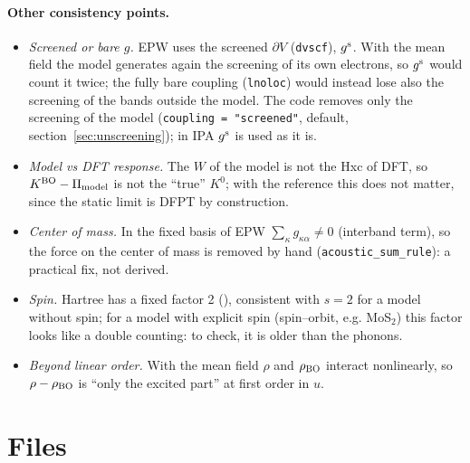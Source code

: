 \documentclass[11pt]{article}
\begin{document}
\paragraph{Other consistency points.}
\begin{itemize}
\item \emph{Screened or bare $g$.} EPW uses the screened $\partial V$ (\texttt{dvscf}), $g^{\rm s}$. With the mean field the
  model generates again the screening of its own electrons, so $g^{\rm s}$ would count it twice; the fully bare coupling
  (\texttt{lnoloc}) would instead lose also the screening of the bands outside the model. The code removes only the
  screening of the model (\texttt{coupling = "screened"}, default, section~\ref{sec:unscreening}); in IPA $g^{\rm s}$ is used as it is.
\item \emph{Model vs DFT response.} The $W$ of the model is not the Hxc of DFT, so $K^{\rm BO}-\Pi_{\rm model}$ is not the
  ``true'' $K^0$; with the reference this does not matter, since the static limit is DFPT by construction.
\item \emph{Center of mass.} In the fixed basis of EPW $\sum_\kappa g_{\kappa\alpha}\neq0$ (interband term), so the force on
  the center of mass is removed by hand (\texttt{acoustic\_sum\_rule}): a practical fix, not derived.
\item \emph{Spin.} Hartree has a fixed factor 2 (), consistent with $s=2$ for a model without spin;
  for a model with explicit spin (spin--orbit, e.g. MoS$_2$) this factor looks like a double counting: to check, it is
  older than the phonons.
\item \emph{Beyond linear order.} With the mean field $\rho$ and $\rho_{\rm BO}$ interact nonlinearly, so
  $\rho-\rho_{\rm BO}$ is ``only the excited part'' at first order in $u$.
\end{itemize}

\section{Files}
\end{document}
